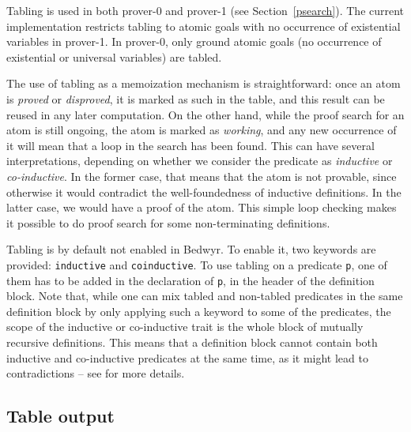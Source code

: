 Tabling is used in both prover-0 and prover-1 (see
Section~\ref{psearch}).  The current implementation restricts tabling to
atomic goals with no occurrence of existential variables in prover-1.
In prover-0, only ground atomic goals (no occurrence of existential or
universal variables) are tabled.

The use of tabling as a memoization mechanism is straightforward: once
an atom is \emph{proved} or \emph{disproved}, it is marked as such in
the table, and this result can be reused in any later computation.  On
the other hand, while the proof search for an atom is still ongoing, the
atom is marked as \emph{working}, and any new occurrence of it will mean
that a loop in the search has been found.  This can have several
interpretations, depending on whether we consider the predicate as
\emph{inductive} or \emph{co-inductive}.  In the former case, that means
that the atom is not provable, since otherwise it would contradict the
well-foundedness of inductive definitions.  In the latter case, we would
have a proof of the atom.  This simple loop checking makes it possible
to do proof search for some non-terminating definitions.

Tabling is by default not enabled in Bedwyr. To enable it, two keywords
are provided: \lstinline+inductive+ and \lstinline+coinductive+.  To use
tabling on a predicate \lstinline+p+, one of them has to be added in the
declaration of \lstinline+p+, in the header of the definition block.
Note that, while one can mix tabled and non-tabled predicates in the
same definition block by only applying such a keyword to some of the
predicates, the scope of the inductive or co-inductive trait is the
whole block of mutually recursive definitions.  This means that a
definition block cannot contain both inductive and co-inductive
predicates at the same time, as it might lead to contradictions -- see
\cite{momigliano03types} for more details.

\subsection{Table output}


